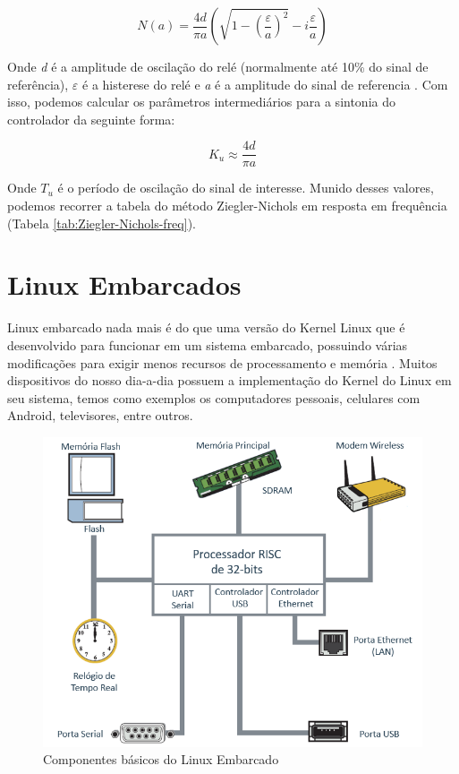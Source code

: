 \begin{equation}\label{eq:n(a)}
  N(a)=\frac{4d}{\pi a}\left(\sqrt{1-\left(\frac{\varepsilon}{a}\right)^{2}}-i\frac{\varepsilon}{a}\right) 
\end{equation}

Onde \textit{d} é a amplitude de oscilação do relé (normalmente até 10\% do sinal de referência), \textit{$\varepsilon$} é a histerese do relé e \textit{a} é a amplitude do sinal de referencia \cite{Levine1996}. Com isso, podemos calcular os parâmetros intermediários para a sintonia do controlador da seguinte forma:

\begin{equation}
  K_u \approx \frac{4d}{\pi a}
\end{equation}

Onde $T_u$ é o período de oscilação do sinal de interesse. Munido desses valores, podemos recorrer a tabela do método Ziegler-Nichols em resposta em frequência (Tabela \ref{tab:Ziegler-Nichols-freq}).



\section{Linux Embarcados}

Linux embarcado  nada mais é do que uma versão do Kernel Linux que é desenvolvido para funcionar em um sistema embarcado, possuindo várias modificações para exigir menos recursos de processamento e memória \cite{Molloy2016}. Muitos dispositivos do nosso dia-a-dia possuem a implementação do Kernel do Linux em seu sistema, temos como exemplos os computadores pessoais, celulares com Android, televisores, entre outros. 

\begin{figure}[H]
  \caption{Componentes básicos do Linux Embarcado}
  \begin{center}
      \includegraphics[scale=0.65]{img/componentes_linux_p13}
  \end{center}
  \label{fig:componentes_linux_p13}
\end{figure}

